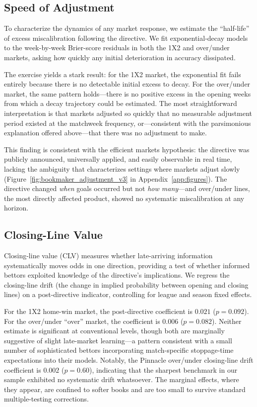 \documentclass[12pt]{article}
\begin{document}
\subsection{Speed of Adjustment}
\label{subsec:halflife}

To characterize the dynamics of any market response, we estimate the
``half-life'' of excess miscalibration following the directive. We fit
exponential-decay models to the week-by-week Brier-score residuals in
both the 1X2 and over/under markets, asking how quickly any initial
deterioration in accuracy dissipated.

The exercise yields a stark result: for the 1X2 market, the exponential
fit fails entirely because there is no detectable initial excess to
decay. For the over/under market, the same pattern holds---there is no
positive excess in the opening weeks from which a decay trajectory could
be estimated. The most straightforward interpretation is that markets
adjusted so quickly that no measurable adjustment period existed at the
matchweek frequency, or---consistent with the parsimonious explanation
offered above---that there was no adjustment to make.

This finding is consistent with the efficient markets hypothesis: the
directive was publicly announced, universally applied, and easily
observable in real time, lacking the ambiguity that characterizes settings
where markets adjust slowly (Figure~\ref{fig:bookmaker_adjustment_v3} in Appendix~\ref{app:figures}).
The directive changed \emph{when} goals occurred but not \emph{how many}---and
over/under lines, the most directly affected product, showed no
systematic miscalibration at any horizon.

\subsection{Closing-Line Value}
\label{subsec:clv}

Closing-line value (CLV) measures whether late-arriving information
systematically moves odds in one direction, providing a test of whether
informed bettors exploited knowledge of the directive's implications.
We regress the closing-line drift (the change in
implied probability between opening and closing lines) on a
post-directive indicator, controlling for league and season fixed effects.

For the 1X2 home-win market, the post-directive coefficient is $0.021$
($p = 0.092$). For the over/under ``over'' market, the coefficient is
$0.006$ ($p = 0.082$). Neither estimate is significant at conventional
levels, though both are marginally suggestive of slight late-market
learning---a pattern consistent with a small number of sophisticated
bettors incorporating match-specific stoppage-time expectations into
their models. Notably, the Pinnacle over/under closing-line drift
coefficient is $0.002$ ($p = 0.60$), indicating that the sharpest
benchmark in our sample exhibited no systematic drift whatsoever. The
marginal effects, where they appear, are confined to softer books and are
too small to survive standard multiple-testing corrections.
\end{document}

